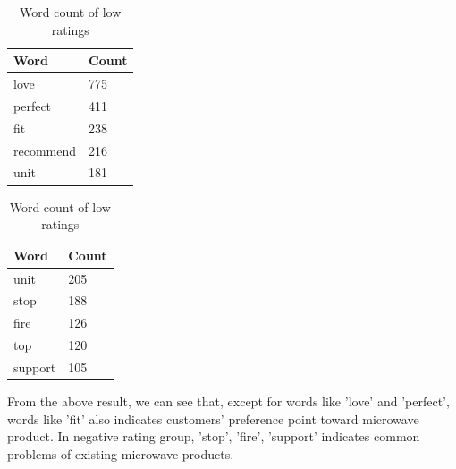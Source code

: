 \documentclass[12pt]{article}
\begin{document}
\begin{table}[!htb]
    \begin{minipage}{.5\linewidth}
      \centering
        \begin{tabular}{ll}
        \hline
            Word & Count \\
            \hline
            love & 775\\
            \hline
            perfect & 411\\
            \hline
            fit & 238\\
            \hline
            recommend & 216\\
            \hline
            unit & 181\\
            \hline
        \end{tabular}
        \caption{Word count of high ratings}
    \end{minipage}%
    \begin{minipage}{.5\linewidth}
      \centering
               \begin{tabular}{ll}
        \hline
            Word & Count \\
            \hline
            unit & 205\\
            \hline
            stop & 188\\
            \hline
            fire & 126\\
            \hline
            top & 120\\
            \hline
            support & 105\\
            \hline
        \end{tabular}
        \caption{Word count of low ratings}
    \end{minipage} 
\end{table}
From the above result, we can see that, except for words like 'love' and 'perfect', words like 'fit' also indicates customers' preference point toward microwave product. In negative rating group, 'stop', 'fire', 'support' indicates common problems of existing microwave products. 
\end{document}
